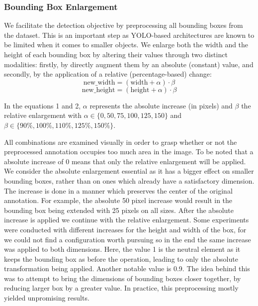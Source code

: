\documentclass[conference]{IEEEtran}
\begin{document}
\subsubsection{Bounding Box Enlargement}
We facilitate the detection objective by preprocessing all bounding boxes from the dataset. This is an important step as YOLO-based architectures are known to be limited when it comes to smaller objects. We enlarge both the width and the height of each bounding box by altering their values through two distinct modalities: firstly, by directly augment them by an absolute (constant) value, and secondly, by the application of a relative (percentage-based) change:
\begin{equation}
\text{new\_width} = ( \text{width} + \alpha ) \cdot \beta
\end{equation}
\begin{equation}
\text{new\_height} = ( \text{height} + \alpha ) \cdot \beta
\end{equation}


In the equations 1 and 2, $\alpha$ represents the absolute increase (in pixels) and $\beta$ the relative enlargement with $\alpha \in \{0, 50, 75, 100, 125, 150\}$ and $\beta \in \{90\%, 100\%, 110\%, 125\%, 150\%\}$.

All combinations are examined visually in order to grasp whether or not the preprocessed annotation occupies too much area in the image. To be noted that a absolute increase of 0 means that only the relative enlargement will be applied. We consider the absolute enlargement essential as it has a bigger effect on smaller bounding boxes, rather than on ones which already have a satisfactory dimension. The increase is done in a manner which preserves the center of the original annotation. For example, the absolute 50 pixel increase would result in the bounding box being extended with 25 pixels on all sizes. 
After the absolute increase is applied we continue with the relative enlargement. Some experiments were conducted with different increases for the height and width of the box, for we could not find a configuration worth pursuing so in the end the same increase was applied to both dimensions. Here, the value 1 is the neutral element as it keeps the bounding box as before the operation, leading to only the absolute transformation being applied. Another notable value is 0.9. The idea behind this was to attempt to bring the dimensions of bounding boxes closer together, by reducing larger box by a greater value. In practice, this preprocessing mostly yielded unpromising results. 
\end{document}
